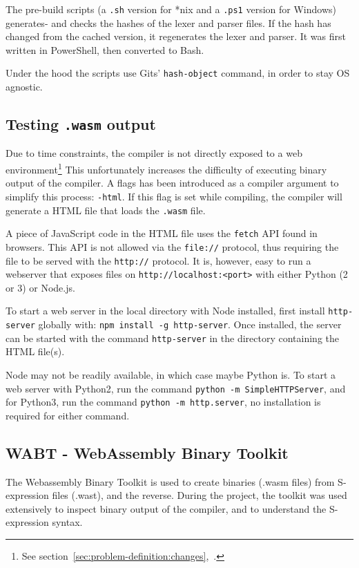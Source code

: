 \documentclass[a4paper]{article}
\begin{document}
The pre-build scripts (a \texttt{.sh} version for *nix and a \texttt{.ps1} version for Windows) generates- and checks the hashes of the lexer and parser files. If the hash has changed from the cached version, it regenerates the lexer and parser. It was first written in PowerShell, then converted to Bash.

Under the hood the scripts use Gits' \texttt{hash-object} command, in order to stay OS agnostic.

\subsection{Testing \texttt{.wasm} output}
\label{sec:peripherals:testing-wasm}
Due to time constraints, the compiler is not directly exposed to a web environment\footnote{See section~\ref{sec:problem-definition:changes},~.} This unfortunately increases the difficulty of executing binary output of the compiler. A flags has been introduced as a compiler argument to simplify this process: \texttt{-html}. If this flag is set while compiling, the compiler will generate a HTML file that loads the \texttt{.wasm} file.

A piece of JavaScript code in the HTML file uses the \texttt{fetch} API found in browsers. This API is not allowed via the \texttt{file://} protocol, thus requiring the file to be served with the \texttt{http://} protocol. It is, however, easy to run a webserver that exposes files on \texttt{http://localhost:<port>} with either Python (2 or 3) or Node.js.

To start a web server in the local directory with Node installed, first install \texttt{http-server} globally with: \verb$npm install -g http-server$. Once installed, the server can be started with the command \texttt{http-server} in the directory containing the HTML file(s).

Node may not be readily available, in which case maybe Python is. To start a web server with Python2, run the command \texttt{python -m SimpleHTTPServer}, and for Python3, run the command \texttt{python -m http.server}, no installation is required for either command.

\subsection{WABT - WebAssembly Binary Toolkit}
\label{sec:peripherals:wabt}
The Webassembly Binary Toolkit is used to create binaries (.wasm files) from S-expression files (.wast), and the reverse. During the project, the toolkit was used extensively to inspect binary output of the compiler, and to understand the S-expression syntax.
\end{document}
